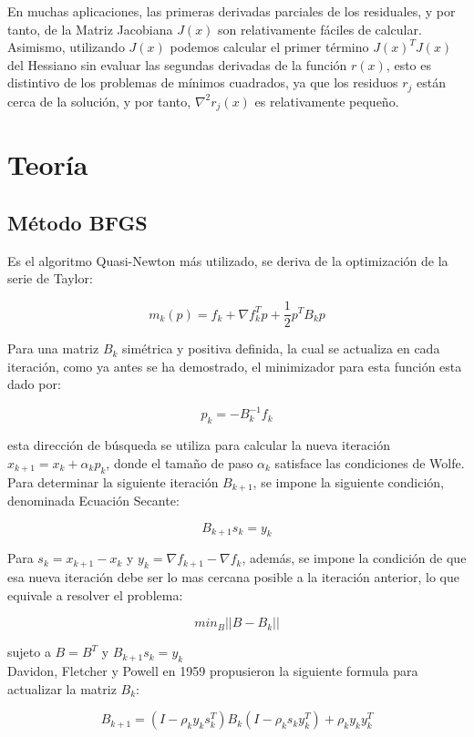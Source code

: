 \documentclass[10pt,journal,compsoc]{styles/IEEEtran}
\begin{document}
En muchas aplicaciones, las primeras derivadas parciales de los residuales, y por tanto, de la Matriz Jacobiana $J(x)$ son relativamente fáciles de calcular. Asimismo, utilizando $J(x)$ podemos calcular el primer t\'ermino $J(x)^T J(x)$ del Hessiano sin evaluar las segundas derivadas de la función $r(x)$, esto es distintivo de los problemas de mínimos cuadrados, ya que los residuos $r_j$ están cerca de la solución, y por tanto, $\nabla^2 r_j (x)$ es relativamente pequeño.\\

\section{Teoría}

\subsection{M\'etodo BFGS}

Es el algoritmo Quasi-Newton m\'as utilizado, se deriva de la optimizaci\'on de la serie de Taylor:

$$m_k(p)=f_k+\nabla f_k^T p+ \frac{1}{2}p^T B_k p$$

Para una matriz $B_k$ sim\'etrica y positiva definida, la cual se actualiza en cada iteraci\'on, como ya antes se ha demostrado, el minimizador para esta función esta dado por:

$$p_k=-B_k^{-1}f_k$$

esta dirección de búsqueda se utiliza para calcular la nueva iteración $x_{k+1}=x_k+\alpha_k p_k$, donde el tamaño de paso $\alpha_k$ satisface las condiciones de Wolfe.\\

Para determinar la siguiente iteración $B_{k+1}$, se impone la siguiente condición, denominada Ecuación Secante:

$$B_{k+1}s_k=y_k$$

Para $s_k=x_{k+1}-x_k$ y $y_k=\nabla f_{k+1}-\nabla f_k$, además, se impone la condición de que esa nueva iteración debe ser lo mas cercana posible a la iteración anterior, lo que equivale a resolver el problema:

$$min_B ||B-B_k||$$

sujeto a $B=B^T$ y $B_{k+1}s_k=y_k$\\

Davidon, Fletcher y Powell en 1959 propusieron la siguiente formula para actualizar la matriz $B_k$:

$$B_{k+1}=(I-\rho_k y_k s_k^T)B_k(I-\rho_k s_k y_k^T)+\rho_k y_k y_k^T$$
\end{document}
